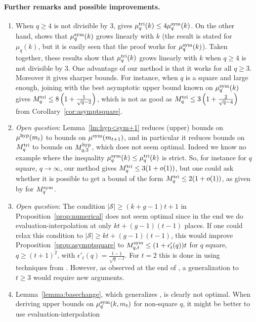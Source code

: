 \documentclass[11pt]{article}
\begin{document}
\paragraph{Further remarks and possible improvements.}
\begin{enumerate}
\item When $q\geq4$ is not divisible by $3$, \cite[Thm.~2]{SL84} gives $\mu^{\textrm{tri}}_q(k)\leq 4\mu^{\textrm{sym}}_q(k)$.
On the other hand, \cite{CC88} shows that $\mu^{\textrm{sym}}_q(k)$ grows linearly with $k$ (the result is stated for $\mu_q(k)$,
but it is easily seen that the proof works for $\mu^{\textrm{sym}}_q(k)$). Taken together, these results show that $\mu^{\textrm{tri}}_q(k)$ grows linearly with $k$
when $q\geq4$ is not divisible by $3$. One advantage of our method is that it works for all $q\geq3$.
Moreover it gives sharper bounds. For instance, when $q$ is a square and large enough, joining \cite[Thm.~2]{SL84} with the best asymptotic upper bound known on $\mu^{\textrm{sym}}_q(k)$ \cite[Thm.~6.4]{Randriam12} gives $M^{\textrm{tri}}_q\leq 8\left(1+\frac{1}{\sqrt{q}-2}\right)$,
which is not as good as $M^{\textrm{tri}}_q\leq 3\left(1+\frac{2}{\sqrt{q}-4}\right)$ from Corollary~\ref{cor:asymptsquare}.
\item \emph{Open question}: Lemma~\ref{lm:hyp<sym+1} reduces (upper) bounds on $\mu^{\textrm{hyp}}(m_t)$ to bounds on $\mu^{\textrm{sym}}(m_{t+1})$,
and in particular it reduces bounds on $M^{\textrm{tri}}_q$ to bounds on $M^{\textrm{hyp}}_{q,3}$, which does not seem optimal.
Indeed we know no example where the inequality $\mu^{\textrm{sym}}_q(k)\leq\mu^{\textrm{tri}}_q(k)$ is strict.
So, for instance for $q$ square, $q\to\infty$, our method gives $M^{\textrm{tri}}_q\leq 3(1+o(1))$,
but one could ask whether it is possible to get a bound of the form $M^{\textrm{tri}}_q\leq 2(1+o(1))$,
as given by \cite[Thm.~6.4]{Randriam12} for $M^{\textrm{sym}}_q$.
\item \emph{Open question}: The condition $|\mathcal{S}|\geq (k+g-1)t+1$ in Proposition~\ref{prop:numerical}
does not seem optimal since in the end we do evaluation-interpolation at only $kt+(g-1)(t-1)$ places.
If one could relax this condition to $|\mathcal{S}|\geq kt+(g-1)(t-1)$, this would improve Proposition~\ref{prop:asymptsquare}
to $M^{\textrm{sym}}_{q,t}\leq(1+\epsilon'_t(q))t$ for $q$ square, $q\geq(t+1)^2$,
with $\epsilon'_t(q)=\frac{t-1}{\sqrt{q}-t}$.
For $t=2$ this is done in \cite{Randriam12,Randriam19} using techniques from \cite{Randriam13}.
However, as observed at the end of \cite{Randriam13}, a generalization to $t\geq3$ would require new arguments.
\item Lemma~\ref{lemma:basechange}, which generalizes \cite[Lemma~1.2]{STV92}, is clearly not optimal.
When deriving upper bounds on $\mu^{\textrm{sym}}_q(k,m_t)$ for non-square $q$, it might be better to use evaluation-interpolation

\end{enumerate}
\end{document}
